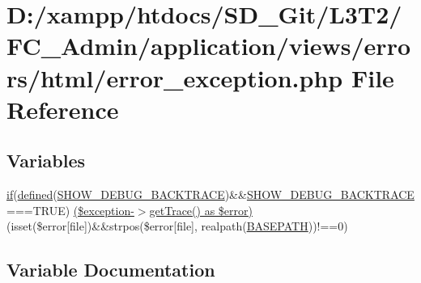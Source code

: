 \hypertarget{_admin_2application_2views_2errors_2html_2error__exception_8php}{}\section{D\+:/xampp/htdocs/\+S\+D\+\_\+\+Git/\+L3\+T2/\+F\+C\+\_\+\+Admin/application/views/errors/html/error\+\_\+exception.php File Reference}
\label{_admin_2application_2views_2errors_2html_2error__exception_8php}
\subsection*{Variables}
\begin{DoxyCompactItemize}
\item 
\hyperlink{_admin_2assets_2js_2bootstrap_8min_8js_a87cf461060832b8b68a7b48d9e371e4f}{if}(\hyperlink{_admin_2tests_2_bootstrap_8php_a46458e8654a714e0565e20f63021add9}{defined}(\textquotesingle{}\hyperlink{_admin_2application_2config_2constants_8php_a7e2dd6fea73799257285946411aeb5ce}{S\+H\+O\+W\+\_\+\+D\+E\+B\+U\+G\+\_\+\+B\+A\+C\+K\+T\+R\+A\+C\+E}\textquotesingle{})\&\&\hyperlink{_admin_2application_2config_2constants_8php_a7e2dd6fea73799257285946411aeb5ce}{S\+H\+O\+W\+\_\+\+D\+E\+B\+U\+G\+\_\+\+B\+A\+C\+K\+T\+R\+A\+C\+E}===T\+R\+U\+E) \hyperlink{_admin_2application_2views_2errors_2html_2error__exception_8php_a58b3444cff3fa104c28c2111a147e3d3}{(\$exception-\/$>$get\+Trace() as \$error)} (isset(\$error\mbox{[}\textquotesingle{}file\textquotesingle{}\mbox{]})\&\&strpos(\$error\mbox{[}\textquotesingle{}file\textquotesingle{}\mbox{]}, realpath(\hyperlink{_admin_2index_8php_ad39801cabfd338dc5524466fe793fda9}{B\+A\+S\+E\+P\+A\+T\+H}))!==0)
\end{DoxyCompactItemize}


\subsection{Variable Documentation}
\hypertarget{_admin_2application_2views_2errors_2html_2error__exception_8php_a58b3444cff3fa104c28c2111a147e3d3}{}
